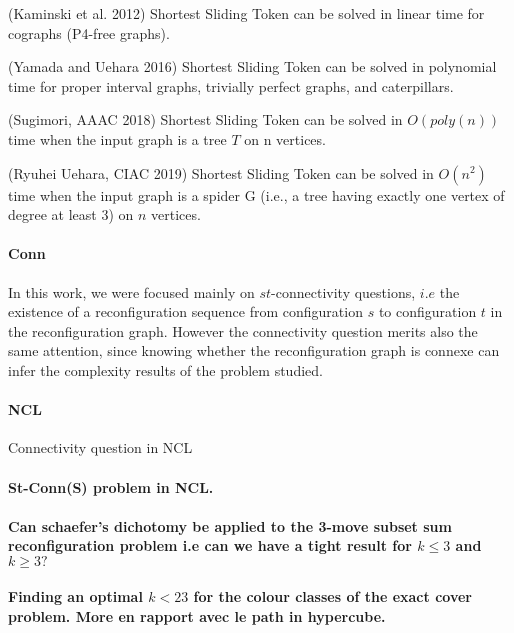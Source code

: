 \begin{theorem}(Kaminski et al. 2012)
Shortest Sliding Token can be solved in linear time for cographs (P4-free graphs).
\end{theorem}

\begin{theorem}(Yamada and Uehara 2016)
Shortest Sliding Token can be solved in polynomial time for proper interval graphs, trivially perfect graphs, and caterpillars.
\end{theorem}

\begin{theorem}(Sugimori, AAAC 2018)
Shortest Sliding Token can be solved in $O(poly(n))$ time when the input graph is a tree $T$ on n vertices.
\end{theorem}

\begin{theorem}(Ryuhei Uehara, CIAC 2019)
Shortest Sliding Token can be solved in $O(n^2)$ time when the input graph is a spider G (i.e., a tree having exactly one
vertex of degree at least $3$) on $n$ vertices.
\end{theorem}

\paragraph{Conn}
In this work, we were focused mainly on $st$-connectivity questions, $i.e$ the existence of a reconfiguration sequence from
configuration $s$ to configuration $t$ in the reconfiguration graph. However the connectivity question merits also the same
attention, since knowing whether the reconfiguration graph is connexe can infer the complexity results of the problem studied.

\paragraph{NCL}
Connectivity question in NCL

\paragraph{St-Conn(S) problem in NCL.}

\paragraph{Can schaefer's dichotomy be applied to the 3-move subset sum reconfiguration problem i.e can we have a tight result for $k \leq 3$ and $k \geq 3 ? $}

\paragraph{Finding an optimal $k < 23$ for the colour classes of the exact cover problem. More en rapport avec le path in hypercube.}
